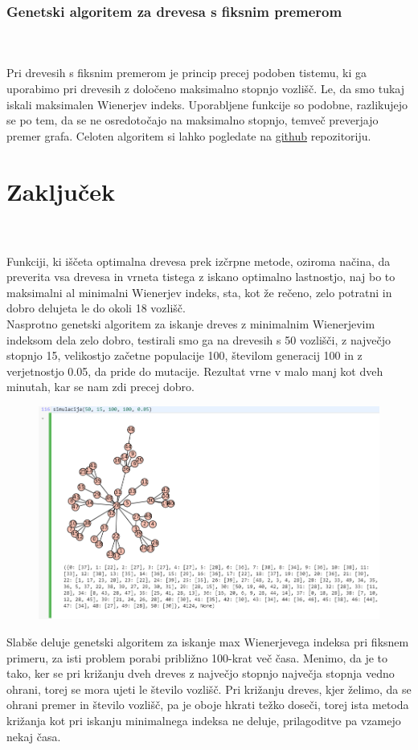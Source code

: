 \documentclass[12pt,a4paper]{amsart}
\theoremstyle{definition} %
\theoremstyle{plain} %
\begin{document}
\subsubsection{Genetski algoritem za drevesa s fiksnim premerom}
\
\\
\\
Pri drevesih s fiksnim premerom je princip precej podoben tistemu, ki ga uporabimo pri drevesih z določeno maksimalno stopnjo vozlišč. Le, da smo tukaj iskali maksimalen Wienerjev indeks.
Uporabljene funkcije so podobne, razlikujejo se po tem, da se ne osredotočajo na maksimalno stopnjo, temveč preverjajo premer grafa. Celoten algoritem si lahko pogledate na \href{https://github.com/HovnikK15/Prescribed-trees-with-max-min-Wiener-index/blob/master/Genetic%20algorithm%20for%20max%20Wiener%20index.sagews}{github} repozitoriju.
\\
\section{Zaključek}
\
\\
\\
Funkciji, ki iščeta optimalna drevesa prek izčrpne metode, oziroma načina, da preverita vsa drevesa in vrneta tistega
z iskano optimalno lastnostjo, naj bo to maksimalni al minimalni Wienerjev indeks, sta, kot že rečeno, zelo potratni in dobro
delujeta le do okoli 18 vozlišč. 
\\
Nasprotno genetski algoritem za iskanje dreves z minimalnim Wienerjevim indeksom dela zelo dobro, testirali smo ga na drevesih s 50 vozlišči,
z največjo stopnjo 15, velikostjo začetne populacije 100, številom generacij 100 in z verjetnostjo 0.05, da pride do mutacije. Rezultat vrne v malo manj kot dveh minutah, kar se nam zdi precej dobro.
\begin{figure}[ht]
\centering
\includegraphics[width=1\textwidth]{slika7}
\end{figure}

\pagebreak
Slabše deluje genetski algoritem za iskanje max Wienerjevega indeksa pri fiksnem primeru, za isti problem porabi približno 100-krat več časa.
Menimo, da je to tako, ker se pri križanju dveh dreves z največjo stopnjo največja stopnja vedno ohrani, torej se mora ujeti le število vozlišč.
Pri križanju dreves, kjer želimo, da se ohrani premer in število vozlišč, pa je oboje hkrati težko doseči, torej ista metoda križanja kot pri
iskanju minimalnega indeksa ne deluje, prilagoditve pa vzamejo nekaj časa.
\end{document}
